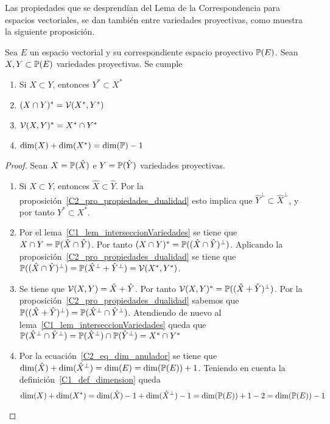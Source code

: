 Las propiedades que se desprendían del Lema de la Correspondencia para espacios vectoriales, se dan también entre variedades proyectivas, como muestra la siguiente proposición.
\begin{prop}
	\label{C2_pro_propiedades_dualidad_proy}
	Sea $E$ un espacio vectorial y su correspondiente espacio proyectivo $\mathbb{P}(E)$. Sean $X,Y\subset\mathbb{P}(E)$ variedades proyectivas. Se cumple
	\begin{enumerate}
		\item Si $X\subset Y$, entonces $Y^*\subset X^*$
		
		\item $(X\cap Y)^*=\mathcal{V}(X^*,Y^*)$
		
		\item $\mathcal{V}(X,Y)^*=X^*\cap Y^*$
		
		\item $\dim(X)+\dim(X^*)=\dim(\mathbb{P})-1$
	\end{enumerate}
\end{prop}
\begin{proof}
	Sean $X=\mathbb{P}(\hat{X})$ e $Y=\mathbb{P}(\hat{Y})$ variedades proyectivas.
	\begin{enumerate}
		\item Si $X\subset Y$, entonces $\hat{X}\subset\hat{Y}$. Por la proposición~\ref{C2_pro_propiedades_dualidad} esto implica que $\hat{Y}^{\perp}\subset \hat{X}^{\perp}$, y por tanto $Y^*\subset X^*$.
		
		\item Por el lema~\ref{C1_lem_interseccionVariedades} se tiene que $X\cap Y=\mathbb{P}(\hat{X}\cap\hat{Y})$. Por tanto $(X\cap Y)^*=\mathbb{P}((\hat{X}\cap\hat{Y})^{\perp})$. Aplicando la proposición~\ref{C2_pro_propiedades_dualidad} se tiene que $\mathbb{P}((\hat{X}\cap\hat{Y})^{\perp})=\mathbb{P}(\hat{X}^{\perp}+\hat{Y}^{\perp})=\mathcal{V}(X^*,Y^*)$.
		
		\item Se tiene que $\mathcal{V}(X,Y)=\hat{X}+\hat{Y}$. Por tanto $\mathcal{V}(X,Y)^*=\mathbb{P}((\hat{X}+\hat{Y})^{\perp})$. Por la proposición~\ref{C2_pro_propiedades_dualidad} sabemos que $\mathbb{P}((\hat{X}+\hat{Y})^{\perp})=\mathbb{P}(\hat{X}^{\perp}\cap\hat{Y}^{\perp})$. Atendiendo de nuevo al lema~\ref{C1_lem_interseccionVariedades} queda que $\mathbb{P}(\hat{X}^{\perp}\cap\hat{Y}^{\perp})=\mathbb{P}(\hat{X}^{\perp})\cap\mathbb{P}(\hat{Y}^{\perp})=X^*\cap Y^*$
		
		\item Por la ecuación~\ref{C2_eq_dim_anulador} se tiene que $\dim(\hat{X})+\dim(\hat{X}^{\perp})=\dim(E)=\dim(\mathbb{P}(E))+1$. Teniendo en cuenta la definición~\ref{C1_def_dimension} queda
		\begin{equation*}
		\dim(X)+\dim(X^*)=\dim(\hat{X})-1+\dim(\hat{X}^{\perp})-1=\dim(\mathbb{P}(E))+1-2=\dim(\mathbb{P}(E))-1
		\end{equation*}
	\end{enumerate}
\end{proof}
